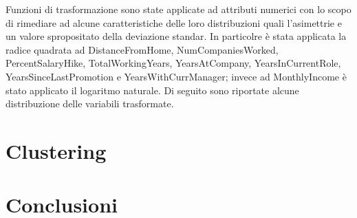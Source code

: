 \documentclass[english]{article}
\begin{document}
Funzioni di trasformazione sono state applicate ad attributi numerici con lo scopo di rimediare ad alcune caratteristiche delle loro distribuzioni quali l'asimettrie e un valore spropositato della deviazione standar. In particolre è stata applicata la radice quadrata ad DistanceFromHome, NumCompaniesWorked, PercentSalaryHike, TotalWorkingYears, YearsAtCompany, YearsInCurrentRole, YearsSinceLastPromotion e YearsWithCurrManager; invece ad MonthlyIncome è stato applicato il logaritmo naturale. Di seguito sono riportate alcune distribuzione delle variabili trasformate.

\section{Clustering}

\section{Conclusioni}
\end{document}
